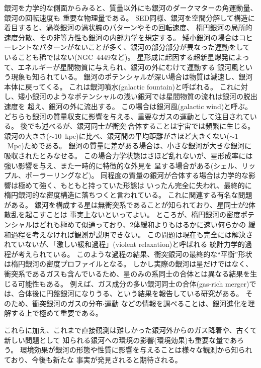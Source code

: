 銀河を力学的な側面からみると、質量以外にも銀河のダークマターの角運動量、銀河の回転速度も
重要な物理量である。
SED同様、銀河を空間分解して構造に着目すると、渦巻銀河の渦状腕のパターンやその回転速度、
楕円銀河の局所的速度分散、その非等方性も銀河の内部力学を規定する。
矮小銀河の場合はコヒーレントなパターンがないことが多く、銀河の部分部分が異なった運動をして
いることも稀ではない(NGC~4449など)。
星形成に起因する超新星爆発によって、エネルギーが星間物質に与えられ、銀河の外にむけて運動する
銀河風という現象も知られている。
銀河のポテンシャルが深い場合は物質は減速し、銀河本体に戻ってくる。
これは銀河噴水(galactic fountain)と呼ばれる。
これに対し、矮小銀河のようなポテンシャルの浅い銀河では星間物質の流れは銀河の脱出速度を
超え、銀河の外に流出する。
この場合は銀河風(galactic wind)と呼ぶ。
どちらも銀河の質量収支に影響を与える、重要なガスの運動として注目されている。
後でも述べるが、銀河同士が衝突$\cdot$合体することは宇宙では頻繁に生じる。
銀河の大きさ($\sim 10$~kpc)に比べ、銀河間の平均距離がさほど大きくない($\sim 1$~Mpc)ためである。
銀河の質量に差がある場合は、小さな銀河が大きな銀河に吸収されたとみなせる。
この場合力学状態はさほど乱れないが、星形成率には強い影響を与え、また一時的に特徴的な外見を
呈する場合がある(シェル、リップル、ポーラーリングなど)。
同程度の質量の銀河が合体する場合は力学的な影響は極めて強く、もともと持っていた形態は
いったん完全に失われ、最終的に楕円銀河的な密度構造に落ちつくと言われている。
これに関連する有名な問題がある。
銀河を構成する星は無衝突系であることが知られており、星同士が2体散乱を起こすことは
事実上ないといってよい。
ところが、楕円銀河の密度ポテンシャルはどれも極めて似通っており、2体緩和よりもはるかに速い何らかの
緩和過程を考えなければ観測が説明できない。
この問題は現在も完全には解決されていないが、「激しい緩和過程」(violent relaxation)と呼ばれる
統計力学的過程が考えられている。
このような過程の結果、衝突銀河の最終的な``平衡''形状は楕円銀河の密度プロファイルとなる。
しかし実際の銀河は星だけではなく、衝突系であるガスも含んでいるため、星のみの系同士の合体とは異なる結果を生じる可能性もある。
例えば、ガス成分の多い銀河同士の合体(gas-rich merger)では、合体後に円盤銀河になりうる、という結果を報告している研究がある\citep{2002MNRAS.333..481B, 2005ApJ...622L...9S, robertson2008, 2009ApJ...691.1168H}。
そのため、衝突銀河のガスの分布$\cdot$運動
などの情報を調べることは、銀河進化を理解する上で極めて重要である。

これらに加え、これまで直接観測は難しかった銀河外からのガス降着や、古くて新しい問題として
知られる銀河への環境の影響(環境効果)も重要な量であろう。
環境効果が銀河の形態や性質に影響を与えることは様々な観測から知られており、今後も新たな
事実が発見されると期待される。

